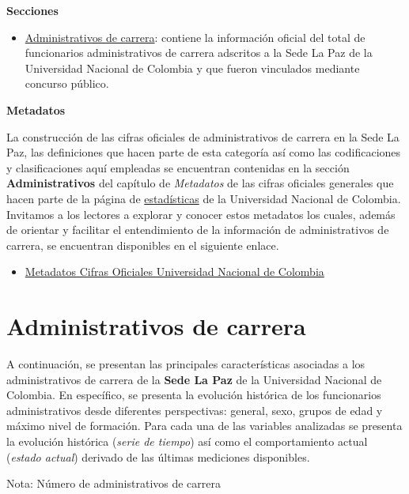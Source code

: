 \documentclass[
]{book}
\providecommand{\tightlist}{%
  \setlength{\itemsep}{0pt}\setlength{\parskip}{0pt}}
\begin{document}
\textbf{Secciones}

\begin{itemize}
\tightlist
\item
  \protect\hyperlink{AdmCar}{Administrativos de carrera}: contiene la información oficial del total de funcionarios administrativos de carrera adscritos a la Sede La Paz de la Universidad Nacional de Colombia y que fueron vinculados mediante concurso público.
\end{itemize}

\textbf{Metadatos}

La construcción de las cifras oficiales de administrativos de carrera en la Sede La Paz, las definiciones que hacen parte de esta categoría así como las codificaciones y clasificaciones aquí empleadas se encuentran contenidas en la sección \textbf{Administrativos} del capítulo de \emph{Metadatos} de las cifras oficiales generales que hacen parte de la página de \href{http://estadisticas.unal.edu.co/home/}{estadísticas} de la Universidad Nacional de Colombia. Invitamos a los lectores a explorar y conocer estos metadatos los cuales, además de orientar y facilitar el entendimiento de la información de administrativos de carrera, se encuentran disponibles en el siguiente enlace.

\begin{itemize}
\tightlist
\item
  \href{http://estadisticas.unal.edu.co/menu-principal/cifras-generales/metadatos/cifras-generales/}{Metadatos Cifras Oficiales Universidad Nacional de Colombia}
\end{itemize}

\hypertarget{AdmCar}{%
\section{Administrativos de carrera}\label{AdmCar}}

A continuación, se presentan las principales características asociadas a los administrativos de carrera de la \textbf{Sede La Paz} de la Universidad Nacional de Colombia. En específico, se presenta la evolución histórica de los funcionarios administrativos desde diferentes perspectivas: general, sexo, grupos de edad y máximo nivel de formación. Para cada una de las variables analizadas se presenta la evolución histórica (\emph{serie de tiempo}) así como el comportamiento actual (\emph{estado actual}) derivado de las últimas mediciones disponibles.

Nota: Número de administrativos de carrera
\end{document}

